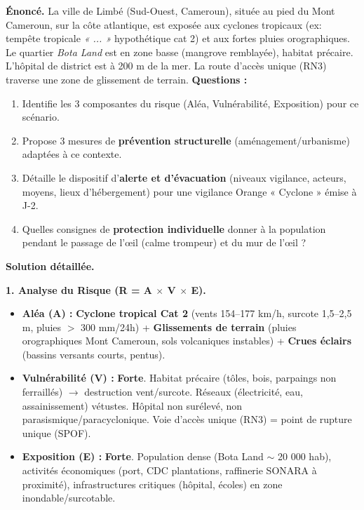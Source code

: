 \documentclass[11pt]{article}
\begin{document}
\begin{exoresolu}
\textbf{Énoncé.} La ville de Limbé (Sud-Ouest, Cameroun), située au pied du Mont Cameroun, sur la côte atlantique, est exposée aux cyclones tropicaux (ex: tempête tropicale \textit{« ... »} hypothétique cat 2) et aux fortes pluies orographiques. Le quartier \textit{Bota Land} est en zone basse (mangrove remblayée), habitat précaire. L'hôpital de district est à 200 m de la mer. La route d'accès unique (RN3) traverse une zone de glissement de terrain.
\textbf{Questions :}
\begin{enumerate}
    \item Identifie les 3 composantes du risque (Aléa, Vulnérabilité, Exposition) pour ce scénario.
    \item Propose 3 mesures de \textbf{prévention structurelle} (aménagement/urbanisme) adaptées à ce contexte.
    \item Détaille le dispositif d'\textbf{alerte et d'évacuation} (niveaux vigilance, acteurs, moyens, lieux d'hébergement) pour une vigilance Orange « Cyclone » émise à J-2.
    \item Quelles consignes de \textbf{protection individuelle} donner à la population pendant le passage de l'œil (calme trompeur) et du mur de l'œil ?
\end{enumerate}

\tcblower
\textbf{Solution détaillée.}

\textbf{1. Analyse du Risque (R = A $\times$ V $\times$ E).}
\begin{itemize}
    \item \textbf{Aléa (A) :} \textbf{Cyclone tropical Cat 2} (vents 154--177 km/h, surcote 1,5--2,5 m, pluies $>$ 300 mm/24h) + \textbf{Glissements de terrain} (pluies orographiques Mont Cameroun, sols volcaniques instables) + \textbf{Crues éclairs} (bassins versants courts, pentus).
    \item \textbf{Vulnérabilité (V) :} \textbf{Forte}. Habitat précaire (tôles, bois, parpaings non ferraillés) $\to$ destruction vent/surcote. Réseaux (électricité, eau, assainissement) vétustes. Hôpital non surélevé, non parasismique/paracyclonique. Voie d'accès unique (RN3) = point de rupture unique (SPOF).
    \item \textbf{Exposition (E) :} \textbf{Forte}. Population dense (Bota Land $\sim$ 20 000 hab), activités économiques (port, CDC plantations, raffinerie SONARA à proximité), infrastructures critiques (hôpital, écoles) en zone inondable/surcotable.
\end{itemize}


\end{exoresolu}
\end{document}
